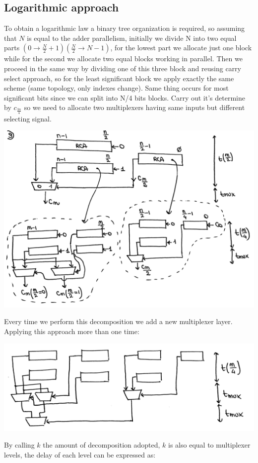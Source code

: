 \subsection{Logarithmic approach}
To obtain a logarithmic law a binary tree organization is required, so assuming that $N$ is equal to the adder parallelism, initially we divide N into two equal parts $(0 \rightarrow \frac{N}{2}+1) (\frac{N}{2} \rightarrow N-1)$, for the lowest part we allocate just one block while for the second we allocate two equal blocks working in parallel. Then we proceed in the same way by dividing one of this three block and reusing carry select approach, so for the least significant block we apply exactly the same scheme (same topology, only indexes change). Same thing occurs for most significant bits since we can split into N/4 bits blocks. Carry out it's determine by $c_{\frac{3n}{4}}$ so we need to allocate two multiplexers having same inputs but different selecting signal.

\begin{center}
  \includegraphics[width=0.7\linewidth]{img/img2/9}
\end{center}


Every time we perform this decomposition we add a new multiplexer layer. Applying this approach more than one time:

\begin{center}
  \includegraphics[width=0.7\linewidth]{img/img2/10}
\end{center}


By calling $k$ the amount of decomposition adopted, $k$ is also equal to multiplexer levels, the delay of each level can be expressed as:

